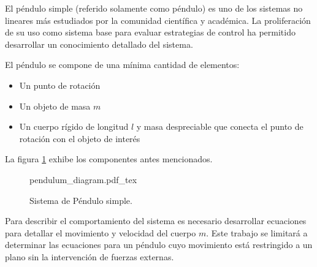 El péndulo simple (referido solamente como péndulo) es uno 
de los sistemas no lineares más estudiados por la 
comunidad científica y académica. La proliferación de su
uso como sistema base para evaluar estrategias de control ha
permitido desarrollar un conocimiento detallado del sistema.


El péndulo se compone de una mínima cantidad de elementos:
\begin{itemize}
 \item Un punto de rotación 
 \item Un objeto de masa $m$
 \item Un cuerpo rígido de longitud $l$ y masa despreciable que conecta el
 punto de rotación con el objeto de interés
\end{itemize}

La figura \ref{fig: simple pendulum} exhibe los componentes antes 
mencionados.


 \begin{figure}[ht]
    \centering
    {pendulum_diagram.pdf_tex}
    \caption{Sistema de Péndulo simple.}
    \label{fig: simple pendulum}
\end{figure}

Para describir el comportamiento del sistema es necesario desarrollar
ecuaciones para detallar el movimiento y velocidad del cuerpo $m$.
Este trabajo se limitará a determinar las ecuaciones para un péndulo
cuyo movimiento está restringido a un plano sin la intervención de fuerzas
externas.

